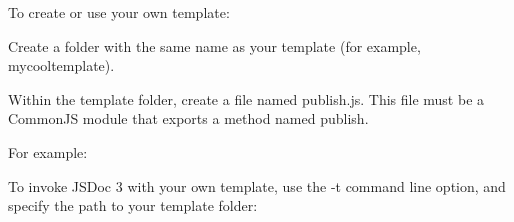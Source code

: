 To create or use your own template\+:


\begin{DoxyEnumerate}
\item Create a folder with the same name as your template (for example, {\ttfamily mycooltemplate}).
\item Within the template folder, create a file named {\ttfamily publish.\+js}. This file must be a Common\+JS module that exports a method named {\ttfamily publish}.
\end{DoxyEnumerate}

For example\+:


\begin{DoxyCode}{0}
\DoxyCodeLine{}
\DoxyCodeLine{/**}
\DoxyCodeLine{ *}
\DoxyCodeLine{ */}
\DoxyCodeLine{\};}
\end{DoxyCode}


To invoke J\+S\+Doc 3 with your own template, use the {\ttfamily -\/t} command line option, and specify the path to your template folder\+:


\begin{DoxyCode}{0}
\end{DoxyCode}
 